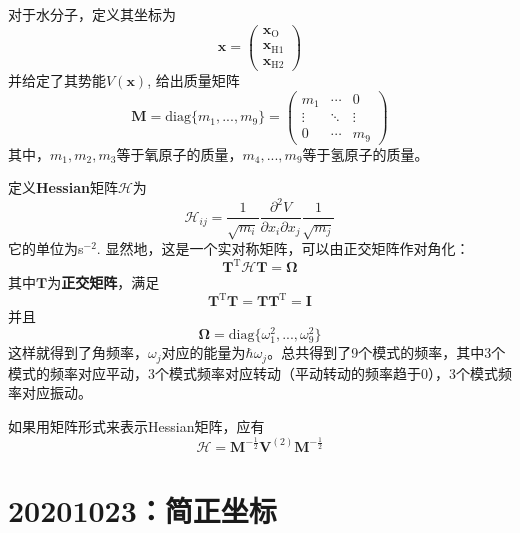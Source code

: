 \documentclass[12pt]{article}
\begin{document}
    对于水分子，定义其坐标为
    \begin{equation}
        \bm{x} = 
        \begin{pmatrix}
            \bm{x}_\mathrm{O}\\
            \bm{x}_{\mathrm{H1}}\\
            \bm{x}_{\mathrm{H2}}
        \end{pmatrix}
    \end{equation}
    并给定了其势能$V(\bm{x})$, 给出质量矩阵
    \begin{equation}
        \bm{M} = \mathrm{diag} \{m_1,...,m_9 \} = 
        \begin{pmatrix}
            m_1 & \cdots & 0\\
            \vdots & \ddots & \vdots\\
            0 & \cdots & m_9
        \end{pmatrix}
    \end{equation}
    其中，$m_1,m_2,m_3$等于氧原子的质量，$m_4,...,m_9$等于氢原子的质量。

    定义\textbf{Hessian}矩阵$\bm{\mathcal{H}}$为 
    \begin{equation}
        \bm{\mathcal{H}}_{ij} = \frac 1{\sqrt{m_i}} \frac {\partial^2 V}{\partial x_i \partial x_j} \frac 1{\sqrt{m_j}}
    \end{equation}
    它的单位为s$^{-2}$. 显然地，这是一个实对称矩阵，可以由正交矩阵作对角化：
    \begin{equation}
        \bm{T}^\mathrm{T} \bm{\mathcal{H}T = \Omega}
    \end{equation}
    其中$\bm{T}$为\textbf{正交矩阵}，满足 
    \begin{equation}
        \bm{T}^\mathrm{T}\bm{T} = \bm{TT}^\mathrm{T} = \bm{I}
    \end{equation}
    并且
    \begin{equation}
        \bm{\Omega} = \mathrm{diag} \{\omega_1^2, ..., \omega_9^2 \}
    \end{equation}
    这样就得到了角频率，$\omega_j$对应的能量为$\hbar \omega_j$。总共得到了9个模式的频率，其中3个模式的频率对应平动，3个模式频率对应转动（平动转动的频率趋于0），3个模式频率对应振动。

    如果用矩阵形式来表示Hessian矩阵，应有
    \begin{equation}
        \bm{\mathcal{H} = M}^{-\frac 12} \bm{V}^{(2)} \bm{M}^{-\frac 12}
    \end{equation}

\section{20201023：简正坐标}
\end{document}
